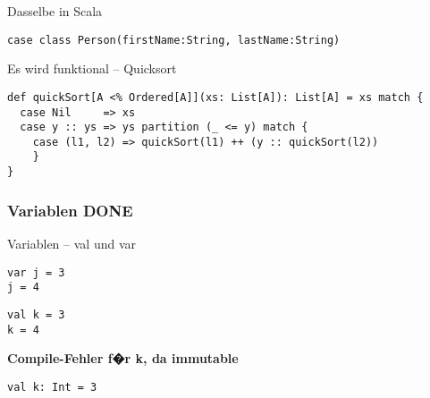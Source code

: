 \documentclass[14pt,aspectratio=169,trans]{beamer} %
\begin{document}
\begin{frame}[fragile]{}
 \begin{block}{Dasselbe in Scala}
\small
	\onslide<2->
  \begin{lstlisting}
case class Person(firstName:String, lastName:String)
	\end{lstlisting}
\end{block}
\end{frame}



\begin{frame}[fragile]{}
 \begin{block}{Es wird funktional -- Quicksort}
\scriptsize
	\onslide<2->
  \begin{lstlisting}
def quickSort[A <% Ordered[A]](xs: List[A]): List[A] = xs match {
  case Nil     => xs
  case y :: ys => ys partition (_ <= y) match {
    case (l1, l2) => quickSort(l1) ++ (y :: quickSort(l2)) 
	}
}
	\end{lstlisting}
\end{block}
\end{frame}

\begin{frame}[plain]
   \begin{centering} 
     \par 
   \end{centering} 
\end{frame} 

\subsubsection*{Variablen DONE}

\begin{frame}[fragile]
 \begin{block}{Variablen -- val und var}
\scriptsize
	\onslide<2->
  \begin{lstlisting}
var j = 3
j = 4
\end{lstlisting}
\begin{lstlisting}[firstnumber=3]
val k = 3
k = 4
\end{lstlisting}
\end{block}
\textbf{Compile-Fehler f�r k, da immutable}
\begin{lstlisting}[firstnumber=5]
val k: Int = 3
	\end{lstlisting}
\end{frame}
\end{document}
